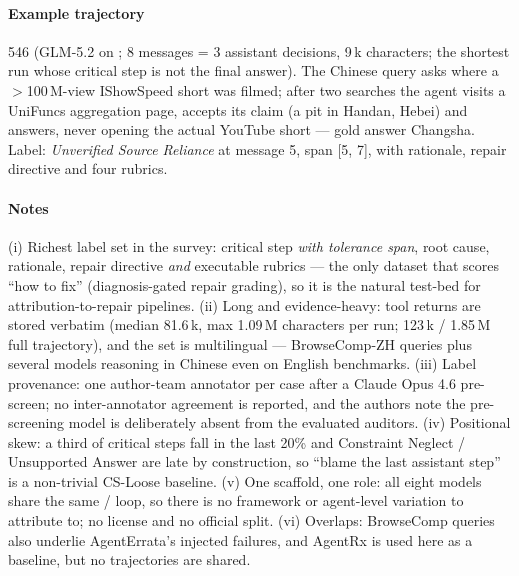 \paragraph{Example trajectory}  546 (GLM-5.2 on ; 8 messages = 3 assistant decisions, 9\,k characters; the shortest run whose critical step is not the final answer). The Chinese query asks where a $>$100\,M-view IShowSpeed short was filmed; after two searches the agent visits a UniFuncs aggregation page, accepts its claim (a pit in Handan, Hebei) and answers, never opening the actual YouTube short --- gold answer Changsha. Label: \emph{Unverified Source Reliance} at message 5, span [5, 7], with rationale, repair directive and four rubrics.


\paragraph{Notes} (i) Richest label set in the survey: critical step \emph{with tolerance span}, root cause, rationale, repair directive \emph{and} executable rubrics --- the only dataset that scores ``how to fix'' (diagnosis-gated repair grading), so it is the natural test-bed for attribution-to-repair pipelines. (ii) Long and evidence-heavy: tool returns are stored verbatim (median 81.6\,k, max 1.09\,M characters per run; 123\,k / 1.85\,M full trajectory), and the set is multilingual --- BrowseComp-ZH queries plus several models reasoning in Chinese even on English benchmarks. (iii) Label provenance: one author-team annotator per case after a Claude Opus 4.6 pre-screen; no inter-annotator agreement is reported, and the authors note the pre-screening model is deliberately absent from the evaluated auditors. (iv) Positional skew: a third of critical steps fall in the last 20\% and Constraint Neglect / Unsupported Answer are late by construction, so ``blame the last assistant step'' is a non-trivial CS-Loose baseline. (v) One scaffold, one role: all eight models share the same / loop, so there is no framework or agent-level variation to attribute to; no license and no official split. (vi) Overlaps: BrowseComp queries also underlie AgentErrata's injected failures, and AgentRx is used here as a baseline, but no trajectories are shared.

